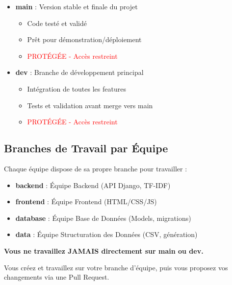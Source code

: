 \documentclass[11pt,a4paper]{article}
\begin{document}
\begin{info}
\begin{itemize}
    \item \textbf{main} : Version stable et finale du projet
    \begin{itemize}
        \item Code testé et validé
        \item Prêt pour démonstration/déploiement
        \item {} \textcolor{red}{PROTÉGÉE - Accès restreint}
    \end{itemize}
    
    \item \textbf{dev} : Branche de développement principal
    \begin{itemize}
        \item Intégration de toutes les features
        \item Tests et validation avant merge vers main
        \item {} \textcolor{red}{PROTÉGÉE - Accès restreint}
    \end{itemize}
\end{itemize}
\end{info}

\subsection{Branches de Travail par Équipe}

Chaque équipe dispose de sa propre branche pour travailler :

\begin{itemize}
    \item \textbf{backend} : Équipe Backend (API Django, TF-IDF)
    \item \textbf{frontend} : Équipe Frontend (HTML/CSS/JS)
    \item \textbf{database} : Équipe Base de Données (Models, migrations)
    \item \textbf{data} : Équipe Structuration des Données (CSV, génération)
\end{itemize}

\begin{important}
\textbf{Vous ne travaillez JAMAIS directement sur main ou dev.}

Vous créez et travaillez sur votre branche d'équipe, puis vous proposez vos changements via une Pull Request.
\end{important}
\end{document}
